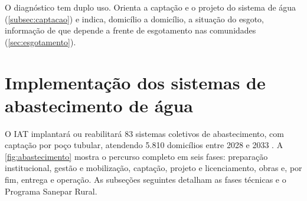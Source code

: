 O diagnóstico tem duplo uso. Orienta a captação e o projeto do sistema de água
(\autoref{subsec:captacao}) e indica, domicílio a domicílio, a situação do
esgoto, informação de que depende a frente de esgotamento nas comunidades
(\autoref{sec:esgotamento}).

\FloatBarrier
\section{Implementação dos sistemas de abastecimento de água}
\label{sec:abastecimento}

O IAT implantará ou reabilitará 83 sistemas coletivos de abastecimento, com
captação por poço tubular, atendendo 5.810 domicílios entre 2028 e 2033
\cite{custo2026}. A \autoref{fig:abastecimento} mostra o percurso completo em
seis fases: preparação institucional, gestão e mobilização, captação, projeto e
licenciamento, obras e, por fim, entrega e operação. As subseções seguintes
detalham as fases técnicas e o Programa Sanepar Rural.

